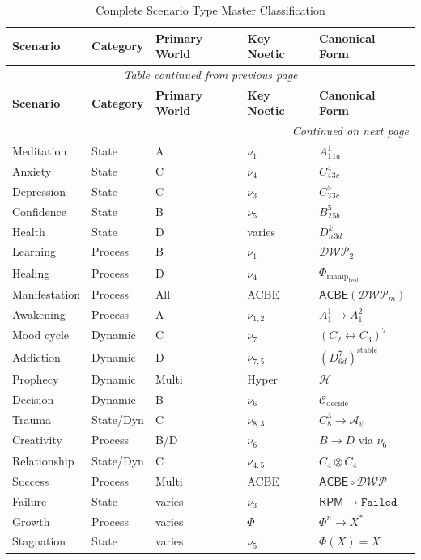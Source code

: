 \documentclass[11pt,twoside]{book}
\renewcommand{\arraystretch}{1.2}  %
\newcommand{\noe}[1]{\nu_{#1}}
\newcommand{\Frac}{\Phi}
\newcommand{\RPM}{\mathsf{RPM}}
\newcommand{\ACBE}{\mathsf{ACBE}}
\newcommand{\Failed}{\mathtt{Failed}}
\newcommand{\PsychAttractor}{\mathcal{A}_\psi}
\newcommand{\ManipFrac}{\Phi_{\mathrm{manip}}}
\newcommand{\Hyperstition}{\mathcal{H}}
\newcommand{\Collapse}{\mathcal{C}}
\newcommand{\DWP}{\mathcal{DWP}}
\begin{document}
\begin{center}
\small
\renewcommand{\arraystretch}{1.25}
\begin{longtable}{p{2cm}|p{1.5cm}|p{1.5cm}|p{1.5cm}|p{3cm}}
\caption{Complete Scenario Type Master Classification} \\
\toprule
\textbf{Scenario} & \textbf{Category} & \textbf{Primary World} & \textbf{Key Noetic} & \textbf{Canonical Form} \\
\midrule
\endfirsthead
\multicolumn{5}{c}{\textit{Table continued from previous page}} \\
\toprule
\textbf{Scenario} & \textbf{Category} & \textbf{Primary World} & \textbf{Key Noetic} & \textbf{Canonical Form} \\
\midrule
\endhead
\midrule
\multicolumn{5}{r}{\textit{Continued on next page}} \\
\endfoot
\bottomrule
\endlastfoot
Meditation & State & A & $\noe{1}$ & $A_1^1_{1a}$ \\
Anxiety & State & C & $\noe{4}$ & $C_4^4_{3c}$ \\
Depression & State & C & $\noe{3}$ & $C_3^5_{3c}$ \\
Confidence & State & B & $\noe{5}$ & $B_2^5_{5b}$ \\
Health & State & D & varies & $D_n^k_{3d}$ \\
Learning & Process & B & $\noe{1}$ & $\DWP_2$ \\
Healing & Process & D & $\noe{4}$ & $\ManipFrac_{\mathrm{heal}}$ \\
Manifestation & Process & All & ACBE & $\ACBE(\DWP_m)$ \\
Awakening & Process & A & $\noe{1,2}$ & $A_1^1 \to A_1^2$ \\
Mood cycle & Dynamic & C & $\noe{7}$ & $(C_2 \leftrightarrow C_3)^7$ \\
Addiction & Dynamic & D & $\noe{7,5}$ & $(D^7_{6d})^{\mathrm{stable}}$ \\
Prophecy & Dynamic & Multi & Hyper & $\Hyperstition$ \\
Decision & Dynamic & B & $\noe{6}$ & $\Collapse_{\mathrm{decide}}$ \\
Trauma & State/Dyn & C & $\noe{8,3}$ & $C_8^3 \to \PsychAttractor$ \\
Creativity & Process & B/D & $\noe{6}$ & $B \to D$ via $\noe{6}$ \\
Relationship & State/Dyn & C & $\noe{4,5}$ & $C_4 \otimes C_4$ \\
Success & Process & Multi & ACBE & $\ACBE \circ \DWP$ \\
Failure & State & varies & $\noe{3}$ & $\RPM \to \Failed$ \\
Growth & Process & varies & $\Frac$ & $\Frac^n \to X^*$ \\
Stagnation & State & varies & $\noe{5}$ & $\Frac(X) = X$ \\
\end{longtable}
\end{center}
\end{document}
